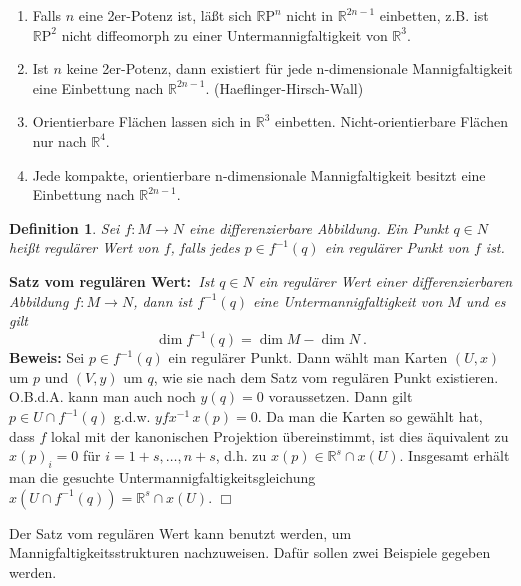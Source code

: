 \documentclass[12pt,a4paper]{article}
\def\R{\mathbb{R}}
\newtheorem{Definition}[Lemma]{Definition}
\def\proof{\noindent\textbf{Beweis:}\quad}
\def\qed{\quad\hfill\ensuremath{\Box}}
\begin{document}
\begin{enumerate}
\item Falls $n$ eine 2er-Potenz ist, l\"a\ss t sich $\R  {\mathrm P}^n$ nicht in $\R^{2n-1}$ einbetten, z.B. ist $\R  {\mathrm P}^2$ nicht
diffeomorph zu einer Untermannigfaltigkeit von $\R^3$.

\item Ist $n$ keine 2er-Potenz, dann existiert f\"ur jede n-dimensionale Mannigfaltigkeit eine Einbettung nach $\R^{2n-1}$.
(Haeflinger-Hirsch-Wall)

\item Orientierbare Fl\"achen lassen sich in $\R^3$ einbetten. Nicht-orientierbare Fl\"achen nur nach $\R^4$.

\item Jede kompakte, orientierbare n-dimensionale Mannigfaltigkeit besitzt eine Einbettung nach $\R^{2n-1}$.
\end{enumerate}


\bigskip

\begin{Definition}
Sei $f:M\rightarrow N$ eine differenzierbare Abbildung. Ein Punkt $q\in N$ hei\ss t
{\em regul\"arer Wert} von $f$, falls jedes $p \in f^{-1}(q)$ ein regul\"arer Punkt
von $f$ ist.
\end{Definition}



\bigskip

{\bf Satz vom regul\"aren Wert:}{\it \, Ist $q\in N$ ein regul\"arer Wert einer differenzierbaren Abbildung
$f:M\rightarrow N$, dann ist $f^{-1}(q)$ eine Untermannigfaltigkeit von $M$ und es gilt
$$
\dim  f^{-1}(q) = \dim M - \dim N \ .
$$ }
\proof
Sei $p \in f^{-1}(q)$ ein regul\"arer Punkt. Dann w\"ahlt man Karten $(U,x)$ um $p$ und $(V,y)$ um $q$, wie
sie nach dem Satz vom regul\"aren Punkt existieren. O.B.d.A. kann man auch noch $y(q)=0$ voraussetzen. Dann gilt
$p \in U \cap f^{-1}(q)$ g.d.w. $yfx^{-1} \,x(p)=0$. Da man die Karten so gew\"ahlt hat, dass $f$ lokal mit der
kanonischen Projektion \"ubereinstimmt, ist dies \"aquivalent zu $x(p)_i = 0$ f\"ur $i=1+s,\ldots, n+s$, d.h.
zu $x(p) \in \R^s \cap x(U)$. Insgesamt erh\"alt man die gesuchte Untermannigfaltigkeitsgleichung
$x(U \cap f^{-1}(q))= \R^s \cap x(U)$.
\qed

\bigskip

Der Satz vom regul\"aren Wert kann benutzt werden, um Mannigfaltigkeitsstrukturen nachzuweisen. Daf\"ur sollen
zwei Beispiele gegeben werden.

\medskip
\end{document}
